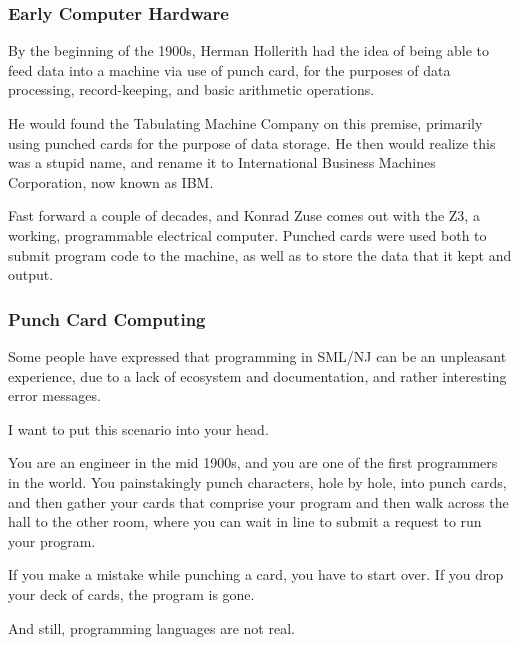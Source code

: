 \documentclass[aspectratio=169, handout]{beamer}
\begin{document}
\begin{frame}[fragile]
  \frametitle{Early Computer Hardware}

  By the beginning of the 1900s, Herman Hollerith had the idea of being able to
  feed data into a machine via use of punch card, for the purposes of data
  processing, record-keeping, and basic arithmetic operations.

  \pause
  \vspace{\fill}

  He would found the Tabulating Machine Company on this premise, primarily
  using punched cards for the purpose of data storage. He then would realize
  this was a stupid name, and rename it to International Business Machines
  Corporation, now known as IBM.

  \pause
  \vspace{\fill}

  Fast forward a couple of decades, and Konrad Zuse comes out with the Z3, a
  working, programmable electrical computer. Punched cards were used both to
  submit program code to the machine, as well as to store the data that it
  kept and output.
\end{frame}

\begin{frame}[fragile]
  \frametitle{Punch Card Computing}

  Some people have expressed that programming in SML/NJ can be an unpleasant
  experience, due to a lack of ecosystem and documentation, and rather
  interesting error messages.

  \pause
  \vspace{\fill}

  I want to put this scenario into your head.

  \pause
  \vspace{\fill}

  You are an engineer in the mid 1900s, and you are one of the first programmers
  in the world. You painstakingly punch characters, hole by hole, into punch cards,
  and then gather your cards that comprise your program and then walk across the
  hall to the other room, where you can wait in line to submit a request to
  run your program.

  \pause
  \vspace{\fill}

  If you make a mistake while punching a card, you have to start over. If you
  drop your deck of cards, the program is gone.

  \pause
  \vspace{\fill}

  And still, programming languages are not real.
\end{frame}
\end{document}

